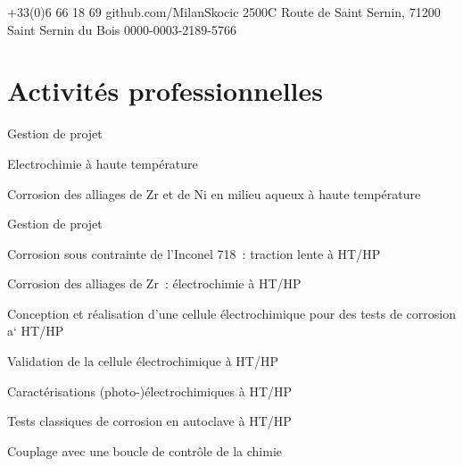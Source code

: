 \documentclass[11pt, a4paper, notitlepage]{article}
\begin{document}
\selectfont
\pagestyle{empty}
	\newpage
	
	
	
	{+33(0)6 66 18 69}
	{github.com/MilanSkocic}
	{2500C Route de Saint Sernin, 71200 Saint Sernin du Bois}
	{0000-0003-2189-5766}


	\section*{Activités professionnelles}
	\begin{jobdetails}		
		\item Gestion de projet
		\item Electrochimie à haute température
		\item Corrosion des alliages de Zr et de Ni en milieu aqueux à haute température
	\end{jobdetails}

	\begin{jobdetails}
		\item Gestion de projet
		\item Corrosion sous contrainte de l’Inconel 718 : traction lente à HT/HP
		\item Corrosion des alliages de Zr : électrochimie à HT/HP
	\end{jobdetails}

        \begin{jobdetails}	
		\item Conception et réalisation d’une cellule électrochimique pour des tests de corrosion a` HT/HP
		\item Validation de la cellule électrochimique à HT/HP
		\item Caractérisations (photo-)électrochimiques à HT/HP
		\item Tests classiques de corrosion en autoclave à HT/HP
		\item Couplage avec une boucle de contrôle de la chimie
	\end{jobdetails}
	
\end{document}
